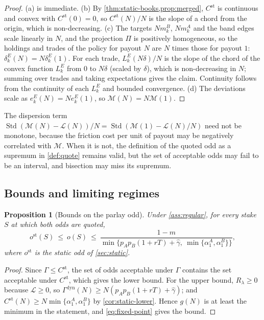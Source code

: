 \documentclass[11pt,a4paper]{article}
\theoremstyle{plain}
\newtheorem{proposition}[theorem]{Proposition}
\theoremstyle{definition}
\theoremstyle{remark}
\newcommand{\1}{\mathbf{1}}
\begin{document}
\begin{proof}
(a) is immediate. (b) By \cref{thm:static-books,prop:merged}, $C^{\mathrm{st}}$ is continuous and convex with $C^{\mathrm{st}}(0)=0$, so $C^{\mathrm{st}}(N)/N$ is the slope of a chord from the origin, which is non-decreasing. (c) The targets $Nm^B_k$, $Nm^A_k$ and the band edges scale linearly in $N$, and the projection $\Pi$ is positively homogeneous, so the holdings and trades of the policy for payout $N$ are $N$ times those for payout $1$: $\delta^E_k(N) = N\delta^E_k(1)$. For each trade, $L^E_k(N\delta)/N$ is the slope of the chord of the convex function $L^E_k$ from $0$ to $N\delta$ (scaled by $\delta$), which is non-decreasing in $N$; summing over trades and taking expectations gives the claim. Continuity follows from the continuity of each $L^E_k$ and bounded convergence. (d) The deviations scale as $e^E_k(N) = Ne^E_k(1)$, so $\mathcal{M}(N) = N\mathcal{M}(1)$.
\end{proof}

The dispersion term $\operatorname{Std}(\mathcal{M}(N)-\mathcal{L}(N))/N = \operatorname{Std}(\mathcal{M}(1)-\mathcal{L}(N)/N)$ need not be monotone, because the friction cost per unit of payout may be negatively correlated with $\mathcal{M}$. When it is not, the definition of the quoted odd as a supremum in \cref{def:quote} remains valid, but the set of acceptable odds may fail to be an interval, and bisection may miss its supremum.

\subsection{Bounds and limiting regimes}

\begin{proposition}[Bounds on the parlay odd]
\label{prop:odd-bounds}
Under \cref{ass:regular}, for every stake $S$ at which both odds are quoted,
\[
o^{\mathrm{st}}(S)\ \leq\ o(S)\ \leq\ \frac{1-m}{\min\bigl\{p_Ap_B(1+rT)+\hat\gamma,\ \min\{\alpha^A_1,\alpha^B_1\}\bigr\}},
\]
where $o^{\mathrm{st}}$ is the static odd of \cref{sec:static}.
\end{proposition}

\begin{proof}
Since $\Gamma\leq C^{\mathrm{st}}$, the set of odds acceptable under $\Gamma$ contains the set acceptable under $C^{\mathrm{st}}$, which gives the lower bound. For the upper bound, $R_\lambda\geq 0$ because $\mathcal{L}\geq 0$, so $\Gamma^{\mathrm{dyn}}(N)\geq N(p_Ap_B(1+rT)+\hat\gamma)$; and $C^{\mathrm{st}}(N)\geq N\min\{\alpha^A_1,\alpha^B_1\}$ by \cref{cor:static-lower}. Hence $g(N)$ is at least the minimum in the statement, and \eqref{eq:fixed-point} gives the bound.
\end{proof}
\end{document}
